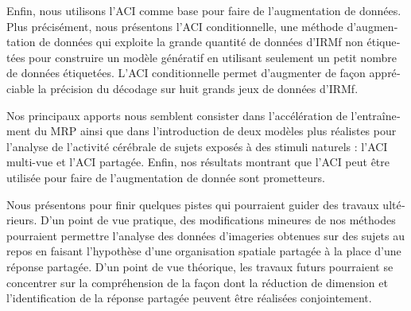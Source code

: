 \begin{otherlanguage}{french}
Enfin, nous utilisons l'ACI comme base pour faire de l'augmentation de données.
%
Plus précisément, nous présentons l’ACI conditionnelle, une méthode d'augmentation de données qui exploite la grande quantité de données d'IRMf non étiquetées pour construire un modèle génératif en utilisant seulement un petit nombre de données étiquetées.
%
L’ACI conditionnelle permet d'augmenter de façon appréciable la précision du décodage sur huit grands jeux de données d'IRMf.

Nos principaux apports nous semblent consister dans l’accélération de l’entraînement du MRP ainsi que dans l’introduction de deux modèles plus réalistes pour l’analyse de l’activité cérébrale de sujets exposés à des stimuli naturels : l’ACI multi-vue et l’ACI partagée.
%
Enfin, nos résultats montrant que l’ACI peut être utilisée pour faire de l’augmentation de donnée sont prometteurs.

Nous présentons pour finir quelques pistes qui pourraient guider des travaux
ultérieurs. D’un point de vue pratique, des modifications mineures de nos
méthodes pourraient permettre l’analyse des données d’imageries obtenues sur des
sujets au repos en faisant l’hypothèse d’une organisation spatiale partagée à la
place d’une réponse partagée.
%
D’un point de vue théorique, les travaux futurs
pourraient se concentrer sur la compréhension de la façon dont la réduction de
dimension et l'identification de la réponse partagée peuvent être réalisées
conjointement.
\end{otherlanguage}

\endgroup

\vfill
